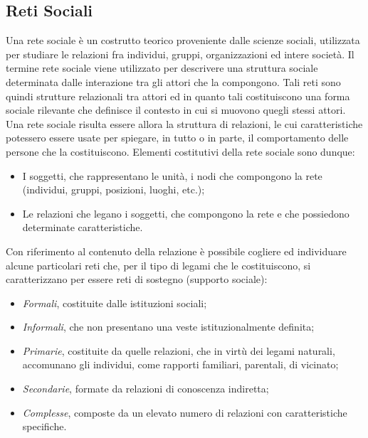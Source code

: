 \subsection{Reti Sociali}
Una rete sociale è un costrutto teorico proveniente dalle scienze sociali, utilizzata per studiare le relazioni fra individui, gruppi, organizzazioni ed intere società. Il termine rete sociale viene utilizzato per descrivere una struttura sociale determinata dalle interazione tra gli attori che la compongono\cite{scott}.
Tali reti sono quindi strutture relazionali tra attori ed in quanto tali costituiscono una forma sociale rilevante che definisce il contesto in cui si muovono quegli stessi attori. Una rete sociale risulta essere allora la struttura di relazioni, le cui caratteristiche potessero essere usate per spiegare, in tutto o in parte, il comportamento delle persone che la costituiscono. Elementi costitutivi della rete sociale sono dunque: 
\begin{itemize}
	\item I soggetti, che rappresentano le unità, i nodi che compongono la rete (individui, gruppi, posizioni, luoghi, etc.); 
	\item Le relazioni che legano i soggetti, che compongono la rete e che possiedono determinate caratteristiche.
\end{itemize}
Con riferimento al contenuto della relazione è possibile cogliere ed individuare alcune particolari reti che, per il tipo di legami che le costituiscono, si caratterizzano per essere reti di sostegno (supporto sociale):
\begin{itemize}
	\item \emph{Formali}, costituite dalle istituzioni sociali;
	\item \emph{Informali}, che non presentano una veste istituzionalmente definita;
	\item \emph{Primarie}, costituite da quelle relazioni, che in virtù dei legami naturali, accomunano gli individui, come rapporti familiari, parentali, di vicinato;
	\item \emph{Secondarie}, formate da relazioni di conoscenza indiretta;
	\item \emph{Complesse}, composte da un elevato numero di relazioni con caratteristiche specifiche.
\end{itemize}
